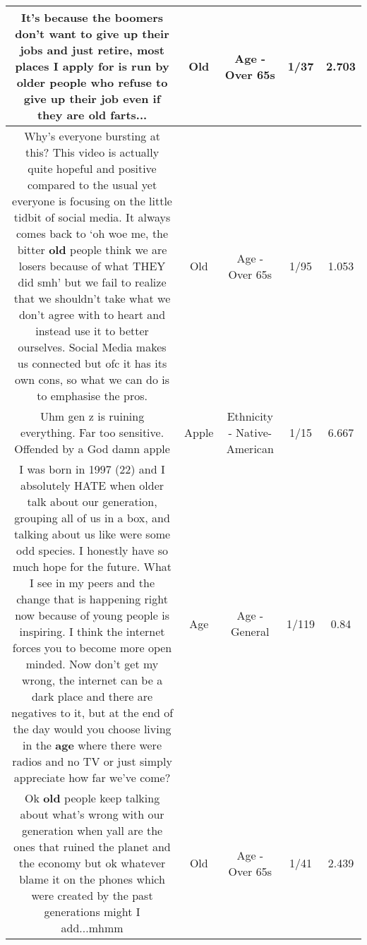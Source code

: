 \documentclass[11pt]{article}
\newlength\mylength
\begin{document}
\begin{center}
\begin{longtable}{|C{.65\mylength}|C{.30\mylength}|C{.12\mylength}|C{.12\mylength}|C{.12\mylength}|}
  \small It's because the boomers don't want to give up their jobs and just retire, most places I apply for is run by older people who refuse to give up their job even if they are \textbf{old} farts...\normalsize   & Old & Age - Over 65s & 1/37 & 2.703 \\  \hline
  \small Why's everyone bursting at this? This video is actually quite hopeful and positive compared to the usual yet everyone is focusing on the little tidbit of social media. It always comes back to ‘oh woe me, the bitter \textbf{old} people think we are losers because of what THEY did smh' but we fail to realize that we shouldn't take what we don't agree with to heart and instead use it to better ourselves. Social Media makes us connected but ofc it has its own cons, so what we can do is to emphasise the pros.\normalsize   & Old & Age - Over 65s & 1/95 & 1.053 \\  \hline
  \small Uhm gen z is ruining everything. Far too sensitive. Offended by a God damn apple\normalsize   & Apple & Ethnicity - Native-American & 1/15 & 6.667 \\  \hline
  \small I was born in 1997 (22) and I absolutely HATE when older talk about our generation, grouping all of us in a box, and talking about us like were some odd species. I honestly have so much hope for the future. What I see in my peers and the change that is happening right now because of young people is inspiring. I think the internet forces you to become more open minded. Now don't get my wrong, the internet can be a dark place and there are negatives to it, but at the end of the day would you choose living in the \textbf{age} where there were radios and no TV or just simply appreciate how far we've come?\normalsize   & Age & Age - General & 1/119 & 0.84 \\  \hline
  \small Ok \textbf{old} people keep talking about what's wrong with our generation when yall are the ones that ruined the planet and the economy but ok whatever blame it on the phones which were created by the past generations might I add...mhmm\normalsize   & Old & Age - Over 65s & 1/41 & 2.439 \\  \hline

\end{longtable}
\end{center}
\end{document}
